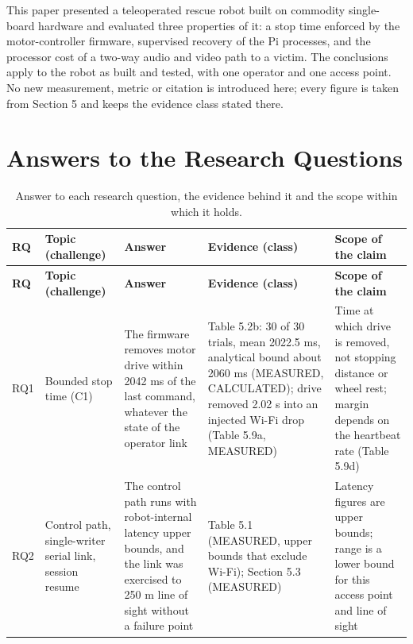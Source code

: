 This paper presented a teleoperated rescue robot built on commodity single-board hardware and evaluated three properties of it: a stop time enforced by the motor-controller firmware, supervised recovery of the Pi processes, and the processor cost of a two-way audio and video path to a victim. The conclusions apply to the robot as built and tested, with one operator and one access point. No new measurement, metric or citation is introduced here; every figure is taken from Section 5 and keeps the evidence class stated there.

\section{Answers to the Research Questions}

\begin{center}
\footnotesize
\setlength{\tabcolsep}{3pt}
\begin{longtable}{|>{\raggedright\arraybackslash}p{0.9cm}|>{\raggedright\arraybackslash}p{2.4cm}|>{\raggedright\arraybackslash}p{3.6cm}|>{\raggedright\arraybackslash}p{3.9cm}|>{\raggedright\arraybackslash}p{3.5cm}|}
\caption{Answer to each research question, the evidence behind it and the scope within which it holds.\label{tab:research-answers}} \\
\hline
\textbf{RQ} & \textbf{Topic (challenge)} & \textbf{Answer} & \textbf{Evidence (class)} & \textbf{Scope of the claim} \\
\hline
\endfirsthead
\textbf{RQ} & \textbf{Topic (challenge)} & \textbf{Answer} & \textbf{Evidence (class)} & \textbf{Scope of the claim} \\
\hline
\endhead
RQ1& Bounded stop time (C1) & The firmware removes motor drive within 2042 ms of the last command, whatever the state of the operator link & Table 5.2b: 30 of 30 trials, mean 2022.5 ms, analytical bound about 2060 ms (MEASURED, CALCULATED); drive removed 2.02 s into an injected Wi-Fi drop (Table 5.9a, MEASURED) & Time at which drive is removed, not stopping distance or wheel rest; margin depends on the heartbeat rate (Table 5.9d) \\
\hline
RQ2 & Control path, single-writer serial link, session resume & The control path runs with robot-internal latency upper bounds, and the link was exercised to 250 m line of sight without a failure point & Table 5.1 (MEASURED, upper bounds that exclude Wi-Fi); Section 5.3 (MEASURED) & Latency figures are upper bounds; range is a lower bound for this access point and line of sight \\

\end{longtable}
\end{center}
